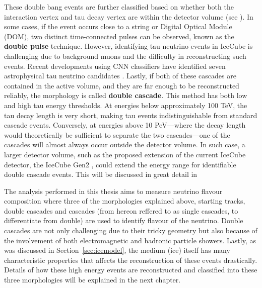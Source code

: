 These double bang events are further classified based on whether both the interaction vertex and tau decay vertex are within the detector volume (see ). In some cases, if the event occurs close to a string or Digital Optical Module (DOM), two distinct time-connected pulses can be observed, known as the \textbf{double pulse} technique. However, identifying tau neutrino events in IceCube is challenging due to background muons and the difficulty in reconstructing such events. Recent developments using CNN classifiers have identified seven astrophysical tau neutrino candidates . Lastly, if both of these cascades are contained in the active volume, and they are far enough to be reconstructed reliably, the morphology is called \textbf{double cascade}. This method has both low and high tau energy thresholds. At energies below approximately 100 TeV, the tau decay length is very short, making tau events indistinguishable from standard cascade events. Conversely, at energies above 10 PeV—where the decay length would theoretically be sufficient to separate the two cascades—one of the cascades will almost always occur outside the detector volume. In such case, a larger detector volume, such as the proposed extension of the current IceCube detector, the  IceCube Gen2 , could extend the energy range for identifiable double cascade events. This will be discussed in great detail in 

The analysis performed in this thesis aims to measure neutrino flavour composition where three of the morphologies explained above, starting tracks, double cascades and cascades (from hereon reffered to as single cascades, to differentiate from double) are used to identify flavour of the neutrino. Double cascades are not only challenging due to their tricky geometry but also because of the involvement of both electromagnetic and hadronic particle showers. Lastly, as was discussed in Section~\ref{sec:icemodel}, the medium (ice) itself has many characteristic properties that affects the reconstruction of these events drastically. Details of how these high energy events are reconstructed and classified into these three morphologies will be explained in the next chapter. 






     

